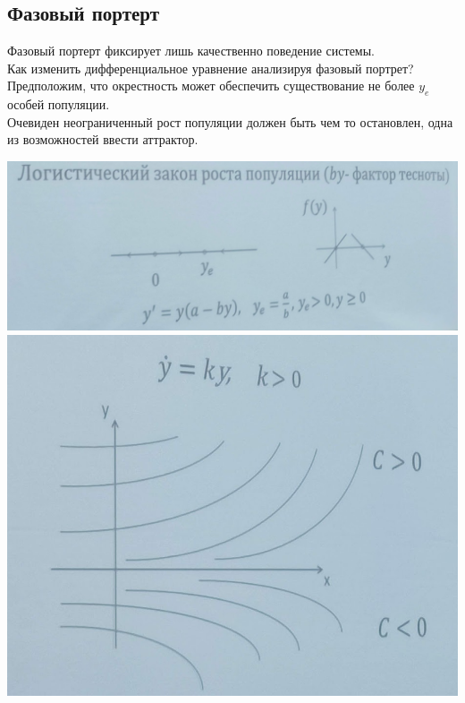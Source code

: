 \documentclass[12pt]{article}
\let\ORIincludegraphics\includegraphics
\renewcommand{\includegraphics}[2][]{\ORIincludegraphics[scale=0.65,#1]{#2}}
\begin{document}
  \subsection*{Фазовый портерт}
  Фазовый портерт фиксирует лишь качественно поведение системы. \\
  Как изменить дифференциальное уравнение анализируя фазовый портрет? \\
  Предположим, что окрестность может обеспечить существование не более
  $y_e$ особей популяции.\\
  Очевиден неограниченный рост популяции должен быть чем то остановлен, одна
  из возможностей ввести аттрактор.
  \begin{center}
    \includegraphics[scale=0.7]{"1.4.2.png"}\\
    \includegraphics[scale=0.7]{"1.4.3.png"}
  \end{center}
\end{document}
